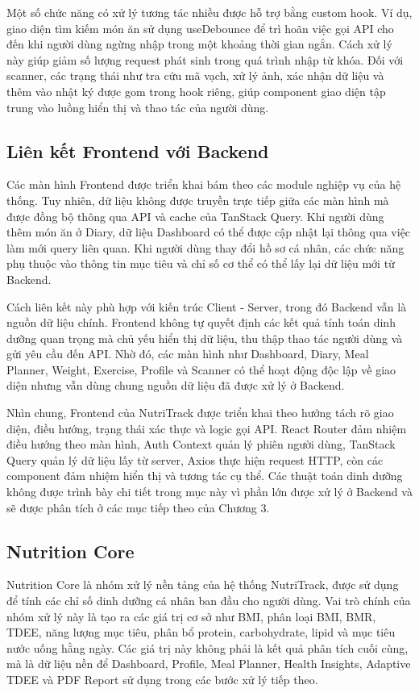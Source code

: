 \documentclass[12pt, a4paper]{report}
\begin{document}
Một số chức năng có xử lý tương tác nhiều được hỗ trợ bằng custom hook. Ví dụ, giao diện tìm kiếm món ăn sử dụng useDebounce để trì hoãn việc gọi API cho đến khi người dùng ngừng nhập trong một khoảng thời gian ngắn. Cách xử lý này giúp giảm số lượng request phát sinh trong quá trình nhập từ khóa. Đối với scanner, các trạng thái như tra cứu mã vạch, xử lý ảnh, xác nhận dữ liệu và thêm vào nhật ký được gom trong hook riêng, giúp component giao diện tập trung vào luồng hiển thị và thao tác của người dùng.

\subsection{Liên kết Frontend với Backend}Các màn hình Frontend được triển khai bám theo các module nghiệp vụ của hệ thống. Tuy nhiên, dữ liệu không được truyền trực tiếp giữa các màn hình mà được đồng bộ thông qua API và cache của TanStack Query. Khi người dùng thêm món ăn ở Diary, dữ liệu Dashboard có thể được cập nhật lại thông qua việc làm mới query liên quan. Khi người dùng thay đổi hồ sơ cá nhân, các chức năng phụ thuộc vào thông tin mục tiêu và chỉ số cơ thể có thể lấy lại dữ liệu mới từ Backend.

Cách liên kết này phù hợp với kiến trúc Client - Server, trong đó Backend vẫn là nguồn dữ liệu chính. Frontend không tự quyết định các kết quả tính toán dinh dưỡng quan trọng mà chủ yếu hiển thị dữ liệu, thu thập thao tác người dùng và gửi yêu cầu đến API. Nhờ đó, các màn hình như Dashboard, Diary, Meal Planner, Weight, Exercise, Profile và Scanner có thể hoạt động độc lập về giao diện nhưng vẫn dùng chung nguồn dữ liệu đã được xử lý ở Backend.

Nhìn chung, Frontend của NutriTrack được triển khai theo hướng tách rõ giao diện, điều hướng, trạng thái xác thực và logic gọi API. React Router đảm nhiệm điều hướng theo màn hình, Auth Context quản lý phiên người dùng, TanStack Query quản lý dữ liệu lấy từ server, Axios thực hiện request HTTP, còn các component đảm nhiệm hiển thị và tương tác cụ thể. Các thuật toán dinh dưỡng không được trình bày chi tiết trong mục này vì phần lớn được xử lý ở Backend và sẽ được phân tích ở các mục tiếp theo của Chương 3.

\subsection{Nutrition Core}Nutrition Core là nhóm xử lý nền tảng của hệ thống NutriTrack, được sử dụng để tính các chỉ số dinh dưỡng cá nhân ban đầu cho người dùng. Vai trò chính của nhóm xử lý này là tạo ra các giá trị cơ sở như BMI, phân loại BMI, BMR, TDEE, năng lượng mục tiêu, phân bổ protein, carbohydrate, lipid và mục tiêu nước uống hằng ngày. Các giá trị này không phải là kết quả phân tích cuối cùng, mà là dữ liệu nền để Dashboard, Profile, Meal Planner, Health Insights, Adaptive TDEE và PDF Report sử dụng trong các bước xử lý tiếp theo.
\end{document}
